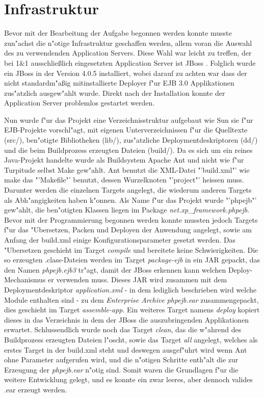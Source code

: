 \section{Infrastruktur}
\label{sec:chap2:infra}

Bevor mit der Bearbeitung der Aufgabe begonnen werden konnte musste zun"achst die n"otige Infrastruktur
geschaffen werden, allem voran die Auswahl des zu verwendenden Application Servers. Diese Wahl war leicht
zu treffen, der bei 1\&1 ausschlie\ss lich eingesetzten Application Server ist JBoss \cite{JBOSSHP}.
Folglich wurde ein JBoss in der Version 4.0.5 installiert, wobei darauf zu achten war dass der
nicht standardm"a\ss ig mitinstallierte Deployer f"ur EJB 3.0 Applikationen zus"atzlich ausgew"ahlt wurde.
Direkt nach der Installation konnte der Application Server problemlos gestartet werden.

Nun wurde f"ur das Projekt eine Verzeichnisstruktur aufgebaut wie Sun sie f"ur EJB-Projekte vorschl"agt, mit
eigenen Unterverzeichnissen f"ur die Quelltexte (src/), ben"otigte Bibliotheken (lib/), zus"atzliche 
Deploymentdeskriptoren (dd/) und die beim Buildprozess erzeugten Dateien (build/).
Da es sich um ein reines Java-Projekt handelte wurde als Buildsystem Apache Ant \cite{ANTHP} und nicht
wie f"ur Turpitude selbst Make gew"ahlt. Ant benutzt die XML-Datei "'build.xml"' wie make das "'Makefile"'
benutzt, dessen Wurzelknoten "'project"' heissen muss. Darunter werden die einzelnen Targets angelegt, die
wiederum anderen Targets als Abh"angigkeiten haben k"onnen. Als Name f"ur das Projekt wurde "'phpejb"' gew"ahlt,
die ben"otigten Klassen liegen im Package \emph{net.xp\_framework.phpejb}. Bevor mit der Programmierung
begonnen werden konnte mussten jedoch Targets f"ur das "Ubersetzen, Packen und Deployen der Anwendung angelegt,
sowie am Anfang der build.xml einige Konfigurationsparameter gesetzt werden.
Das "Ubersetzen geschieht im Target \emph{compile} und bereitete keine Schwierigkeiten. Die so erzeugten
.class-Dateien werden im Target \emph{package-ejb} in ein JAR gepackt, das den Namen \emph{phpejb.ejb3} tr"agt,
damit der JBoss erkennen kann welchen Deploy-Mechanismus er verwenden muss. Dieses JAR wird zusammen mit 
dem Deploymentdeskriptor \emph{application.xml} - in dem lediglich beschrieben wird welche Module enthalten sind - zu
dem \emph{Enterprise Archive} \emph{phpejb.ear} zusammengepackt, dies geschieht im Target \emph{assemble-app}.
Ein weiteres Target namens \emph{deploy} kopiert dieses in das Verzeichnis in dem der JBoss die auszubringenden
Applikationen erwartet. Schlussendlich wurde noch das Target \emph{clean}, das die w"ahrend des
Buildprozess erzeugten Dateien l"oscht, sowie das Target \emph{all} angelegt, welches als erstes Target in der
build.xml steht und deswegen ausgef"uhrt wird wenn Ant ohne Parameter aufgerufen wird, und die n"otigen Schritte
enth"alt die zur Erzeugung der \emph{phpejb.ear} n"otig sind. Somit waren die Grundlagen f"ur die weitere
Entwicklung gelegt, und es konnte ein zwar leeres, aber dennoch valides .ear erzeugt werden.


